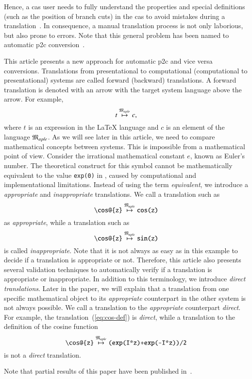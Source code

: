 Hence, a \gls*{cas} user needs to fully understand the properties and special definitions (such as the position of branch cuts) in the \gls*{cas} to avoid mistakes during a translation~\parencite{Maple:Cuts}. In consequence, a manual translation process is not only laborious, but also prone to errors. Note that this general problem has been named to automatic \gls*{p2c} conversion~\parencite{POM-Tagger}.

This article presents a new approach for automatic \gls{p2c} and vice versa conversions. Translations from presentational to computational (computational to presentational) systems are called forward (backward) translations. A forward translation is denoted with an arrow with the target system language above the arrow. For example,
\begin{equation*}
t \overset{\mathfrak{M}_{aple}}{\mapsto} c,
\end{equation*}
where $t$ is an expression in the \LaTeX{} language and $c$ is an element of the \Maple{} language $\mathfrak{M}_{aple}$. As we will see later in this article, we need to compare mathematical concepts between systems. This is impossible from a mathematical point of view. Consider the irrational mathematical constant $e$, known as Euler's number. The theoretical construct for this symbol cannot be mathematically equivalent to the value \verb|exp(0)| in \Maple, caused by computational and implementational limitations. Instead of using the term \textit{equivalent}, we introduce a \textit{appropriate} and \textit{inappropriate} translations. We call a translation such as
\begin{equation}\label{eq:cos-def}
\verb|\cos@{z}| \overset{\langMaple}{\mapsto} \verb|cos(z)|
\end{equation}
as \textit{appropriate}, while a translation such as
\begin{equation}
\verb|\cos@{z}| \overset{\langMaple}{\mapsto} \verb|sin(z)|
\end{equation}
is called \textit{inappropriate}. Note that it is not always as easy as in this example to decide if a translation is appropriate or not. Therefore, this article also presents several validation techniques to automatically verify if a translation is appropriate or inappropriate. In addition to this terminology, we introduce \textit{direct translations}. Later in the paper, we will explain that a translation from one specific mathematical object to its \textit{appropriate} counterpart in the other system is not always possible. We call a translation to the \textit{appropriate} counterpart \textit{direct}. For example, the translation~(\ref{eq:cos-def}) is \textit{direct}, while a translation to the definition of the cosine function
\begin{equation*}
\verb|\cos@{z}| \overset{\langMaple}{\mapsto} \verb|(exp(I*z)+exp(-I*z))/2|
\end{equation*}
is not a \textit{direct} translation.

Note that partial results of this paper have been published in~\parencite{CICM:Paper}.